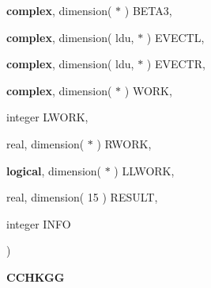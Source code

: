{\begin{DoxyParamCaption}
\item[{{\bf complex}, dimension( $\ast$ )}]{B\+E\+T\+A3, }
\item[{{\bf complex}, dimension( ldu, $\ast$ )}]{E\+V\+E\+C\+T\+L, }
\item[{{\bf complex}, dimension( ldu, $\ast$ )}]{E\+V\+E\+C\+T\+R, }
\item[{{\bf complex}, dimension( $\ast$ )}]{W\+O\+R\+K, }
\item[{integer}]{L\+W\+O\+R\+K, }
\item[{real, dimension( $\ast$ )}]{R\+W\+O\+R\+K, }
\item[{{\bf logical}, dimension( $\ast$ )}]{L\+L\+W\+O\+R\+K, }
\item[{real, dimension( 15 )}]{R\+E\+S\+U\+L\+T, }
\item[{integer}]{I\+N\+F\+O}
\end{DoxyParamCaption}
)}\label{group__complex__eig_ga712d308fd40a2f0f279fe4a0c8544a30}


{\bfseries C\+C\+H\+K\+G\+G} 

